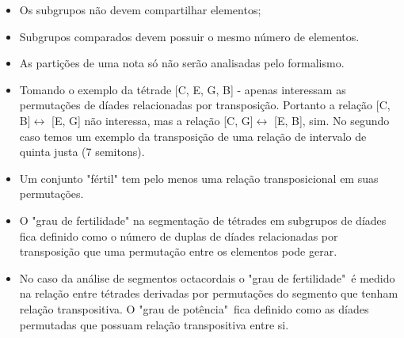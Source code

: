 \documentclass[
	12pt,				%
	openright,			%
	twoside,			%
	a4paper,			%
	english,			%
	french,				%
	spanish,			%
	brazil				%
	]{abntex2}
\begin{document}
\begin{itemize}
\item Os subgrupos não devem compartilhar elementos;
\item Subgrupos comparados devem possuir o mesmo número de elementos. 
\item As partições de uma nota só não serão analisadas pelo formalismo.
\item Tomando o exemplo da tétrade [C, E, G, B] - apenas interessam as permutações de díades relacionadas por transposição. Portanto a relação [C, B]$\leftrightarrow $ [E, G] não interessa, mas a relação [C, G]$\leftrightarrow $ [E, B], sim. No segundo caso temos um exemplo da transposição de uma relação de intervalo de quinta justa (7 semitons).
\item Um conjunto "fértil" tem pelo menos uma relação transposicional em suas permutações.
\item O "grau de fertilidade" na segmentação de tétrades em subgrupos de díades fica definido como o número de duplas de díades relacionadas por transposição que uma permutação entre os elementos pode gerar.
\item No caso da análise de segmentos octacordais o "grau de fertilidade"\ é medido na relação entre tétrades derivadas por permutações do segmento que tenham relação transpositiva. O "grau de potência"\ fica definido como as díades permutadas que possuam relação transpositiva entre si.

\end{itemize}
\end{document}
